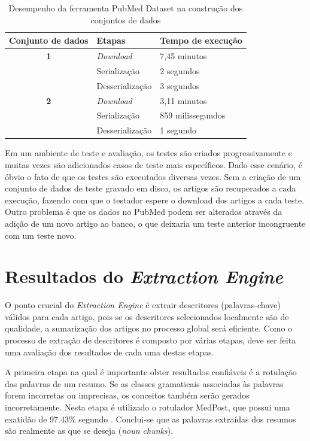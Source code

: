 \begin{table}[htbp]
\center
\begin{tabular}{|l|l|l|}
\hline
\textbf{Conjunto de dados} & \textbf{Etapas} & \textbf{Tempo de execução} \\ \hline
\multicolumn{ 1}{|c|}{\textbf{1}} & \textit{Download} & 7,45 minutos \\ \cline{ 2- 3}
\multicolumn{ 1}{|l|}{} & Serialização & 2 segundos \\ \cline{ 2- 3}
\multicolumn{ 1}{|l|}{} & Desserialização & 3 segundos \\ \hline
\multicolumn{ 1}{|c|}{\textbf{2}} & \textit{Download} & 3,11 minutos \\ \cline{ 2- 3}
\multicolumn{ 1}{|l|}{} & Serialização & 859 milissegundos \\ \cline{ 2- 3}
\multicolumn{ 1}{|l|}{} & Desserialização & 1 segundo \\ \hline
\end{tabular}
\caption{Desempenho da ferramenta PubMed Dataset na construção dos conjuntos de dados}
\label{tab:tempoExecucao}
\end{table}

Em um ambiente de teste e avaliação, os testes são criados progressivamente e muitas vezes são adicionados casos de teste mais específicos. Dado esse cenário, é óbvio o fato de que os testes são executados diversas vezes. Sem a criação de um conjunto de dados de teste gravado em disco, os artigos são recuperados a cada execução, fazendo com que o testador espere o download dos artigos a cada teste. Outro problema é que os dados no PubMed podem ser alterados através da adição de um novo artigo ao banco, o que deixaria um teste anterior incongruente com um teste novo. 

\section{Resultados do \emph{Extraction Engine}}

O ponto crucial do \emph{Extraction Engine} é extrair descritores (palavras-chave) válidos para cada artigo, pois se os descritores selecionados localmente são de qualidade, a sumarização dos artigos no processo global será eficiente. Como o processo de extração de descritores é composto por várias etapas, deve ser feita uma avaliação dos resultados de cada uma destas etapas.

A primeira etapa na qual é importante obter resultados confiáveis é a rotulação das palavras de um resumo. Se as classes gramaticais associadas às palavras forem incorretas ou imprecisas, os conceitos também serão gerados incorretamente.  Nesta etapa é utilizado o rotulador MedPost, que possui uma exatidão de 97.43\% segundo \cite{Smith2004}. Conclui-se que as palavras extraídas dos resumos são realmente as que se deseja (\emph{noun chunks}).

